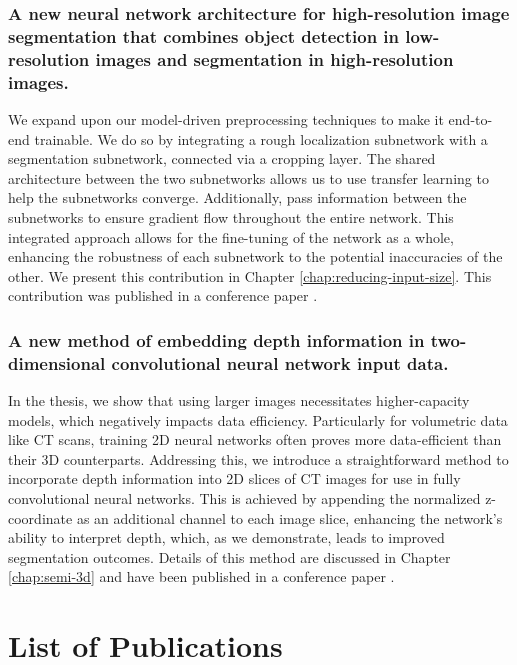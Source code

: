 \subsubsection{A new neural network architecture for high-resolution image segmentation that combines object detection in low-resolution images and segmentation in high-resolution images.}

We expand upon our model-driven preprocessing techniques to make it end-to-end trainable. We do so by integrating a rough localization subnetwork with a segmentation subnetwork, connected via a cropping layer. The shared architecture between the two subnetworks allows us to use transfer learning to help the subnetworks converge. Additionally, pass information between the subnetworks to ensure gradient flow throughout the entire network. This integrated approach allows for the fine-tuning of the network as a whole, enhancing the robustness of each subnetwork to the potential inaccuracies of the other. We present this contribution in Chapter \ref{chap:reducing-input-size}. This contribution was published in a conference paper .

\subsubsection{A new method of embedding depth information in two-dimensional convolutional neural network input data.}

In the thesis, we show that using larger images necessitates higher-capacity models, which negatively impacts data efficiency. Particularly for volumetric data like CT scans, training 2D neural networks often proves more data-efficient than their 3D counterparts. Addressing this, we introduce a straightforward method to incorporate depth information into 2D slices of CT images for use in fully convolutional neural networks. This is achieved by appending the normalized z-coordinate as an additional channel to each image slice, enhancing the network's ability to interpret depth, which, as we demonstrate, leads to improved segmentation outcomes. Details of this method are discussed in Chapter \ref{chap:semi-3d} and have been published in a conference paper \cite{bencevicEpicardialAdiposeTissue2021}.

\section{List of Publications}

